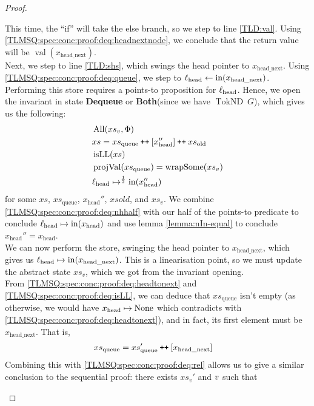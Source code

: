 \documentclass[a4paper, 10pt]{report}
\theoremstyle{definition}
\newcommand{\xsc}{xs}
\newcommand{\xsqueue}{xs_{\mathrm{queue}}}
\newcommand{\xsold}{xs_{\mathrm{old}}}
\newcommand{\isLL}{\operatorname{isLL}}
\newcommand{\AllP}{\operatorname{All}}
\newcommand{\projval}{\operatorname{projVal}}
\newcommand{\wrapsome}{\operatorname{wrapSome}}
\newcommand{\locN}[1]{\loc_{\mathrm{#1}}}
\newcommand{\lochead}{\locN{head}}
\newcommand{\nIn}[1]{\operatorname{in}(#1)}
\newcommand{\nVal}[1]{\operatorname{val}(#1)}
\newcommand{\node}{x}
\newcommand{\nodeN}[1]{\node_{\mathrm{#1}}}
\newcommand{\nodehead}{\nodeN{head}}
\newcommand{\nodeheadnext}{\nodeN{head\_next}}
\newcommand{\absvalue}{\val}
\newcommand{\absvalueList}{xs_v}
\newcommand{\DequeueState}{\textbf{Dequeue}\xspace}
\newcommand{\BothState}{\textbf{Both}\xspace}
\newcommand{\Qg}{G}
\newcommand{\TokND}[1]{\operatorname{TokND} ~ #1}
\newcommand{\TokNDQg}{\TokND{\Qg}}
\newcommand\catenate{\mathbin{\text{\ttfamily\upshape ++}}}
\begin{document}
\begin{proof}
\begin{itemize}
  This time, the ``if'' will take the else branch, so we step to line \ref{TLD:val}. Using \ref{TLMSQ:spec:conc:proof:deq:headnextnode}, we conclude that the return value will be $\nVal{\nodeheadnext}$.\\
  Next, we step to line \ref{TLD:shs}, which swings the head pointer to $\nodeheadnext$. Using \ref{TLMSQ:spec:conc:proof:deq:queue}, we step to $\lochead \gets \nIn{\nodeheadnext}$. Performing this store requires a points-to proposition for $\lochead$. Hence, we open the invariant in state \DequeueState or \BothState (since we have $\TokNDQg$), which gives us the following:
  \begin{align}
    &\AllP(\absvalueList, \Phi)\label{TLMSQ:spec:conc:proof:deq:allP}\\
    &\xsc = \xsqueue \catenate [\nodehead''] \catenate \xsold\label{TLMSQ:spec:conc:proof:deq:xsrel}\\
    &\isLL(\xsc)\label{TLMSQ:spec:conc:proof:deq:isLL}\\
    &\projval(\xsqueue) = \wrapsome(\absvalueList)\label{TLMSQ:spec:conc:proof:deq:rel}\\
    &\lochead \mapsto^{\frac{1}{2}} \nIn{\nodehead''}\label{TLMSQ:spec:conc:proof:deq:nhhalf}
  \end{align}
  for some $\xsc$, $\xsqueue$, $\nodehead''$,  $xsold$, and $\absvalueList$. We combine \ref{TLMSQ:spec:conc:proof:deq:nhhalf} with our half of the points-to predicate to conclude $\lochead \mapsto \nIn{\nodehead}$ and use lemma \ref{lemma:nIn-equal} to conclude $\nodehead'' = \nodehead$.\\
  We can now perform the store, swinging the head pointer to $\nodeheadnext$, which gives us $\lochead \mapsto \nIn{\nodeheadnext}$. This is a linearisation point, so we must update the abstract state $\absvalueList$, which we got from the invariant opening.\\
  From \ref{TLMSQ:spec:conc:proof:deq:headtonext} and \ref{TLMSQ:spec:conc:proof:deq:isLL}, we can deduce that $\xsqueue$ isn't empty (as otherwise, we would have $\nodehead \mapsto \None$ which contradicts with \ref{TLMSQ:spec:conc:proof:deq:headtonext}), and in fact, its first element must be $\nodeheadnext$. That is,
  \begin{align}
    &\xsqueue = \xsqueue' \catenate [\nodeheadnext]\label{TLMSQ:spec:conc:proof:deq:xsqueue}
  \end{align}
  Combining this with \ref{TLMSQ:spec:conc:proof:deq:rel} allows us to give a similar conclusion to the sequential proof: there exists $\absvalueList'$ and $\absvalue$ such that

\end{itemize}
\end{proof}
\end{document}
